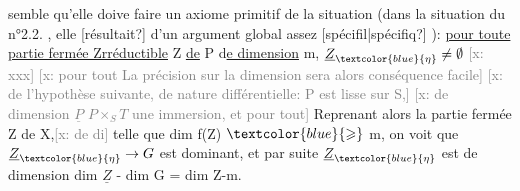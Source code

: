 \documentclass[11pt]{article}
\newcommand{\scanpage}[1]{\par\bigskip\noindent{\small\sffamily[scan #1]}\par}
\newcommand{\mspage}[1]{{\small\sffamily[p.\,#1]}}
\newcommand{\hand}[1]{\textcolor{blue}{#1}}
\newcommand{\xout}[1]{\textcolor{gray}{[\textsf{x:} #1]}}
\newcommand{\uline}[1]{\underline{#1}}
\newcommand{\unsure}[1]{[#1?]}
\begin{document}
\mspage{93}

\clearpage
\scanpage{25/94}
\mspage{88}
semble qu'elle doive faire un axiome primitif de la situation (dans la
situation du n°2.2. , elle \unsure{résultait} d'un argument global assez \unsure{spécifil|spécifiq} ):
\uline{pour toute partie fermée Zrréductible} Z \uline{de} P d\uline{e dimension} m, $\underline{Z}_{\hand{\eta}} \neq \emptyset$ \xout{xxx}
\xout{pour tout La précision sur la dimension sera alors conséquence facile}
\xout{de l'hypothèse suivante, de nature différentielle: P est lisse sur S,}
\xout{de dimension $\underline{P}$ $P \times_S T$ une immersion, et pour tout} Reprenant alors la
partie fermée Z de X,\xout{de di} telle que dim f(Z) $\hand{\geqslant}$ m, on voit que $\underline{Z}_{\hand{\eta}} \rightarrow G$ est
dominant, et par suite $\underline{Z}_{\hand{\eta}}$ est de dimension dim $\underline{Z}$ - dim G = dim Z-m.
\end{document}
